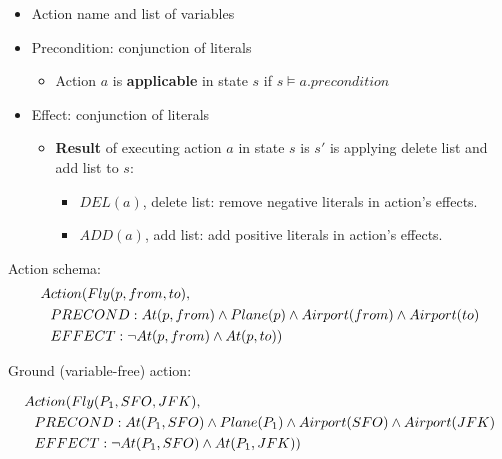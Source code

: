 \documentclass[11pt]{article}
\begin{document}
\begin{itemize}
\item Action name and list of variables
\item Precondition: conjunction of literals

\begin{itemize}
\item Action \(a\) is \textbf{applicable} in state \(s\) if \(s \models a.precondition\)
\end{itemize}

\item Effect: conjunction of literals

\begin{itemize}
\item \textbf{Result} of executing action \(a\) in state \(s\) is \(s'\) is applying delete list and add list to \(s\):

\begin{itemize}
\item \(DEL(a)\), delete list: remove negative literals in action's effects.
\item \(ADD(a)\), add list: add positive literals in action's effects.
\end{itemize}
\end{itemize}
\end{itemize}


Action schema:
\vspace{-.25in}
\begin{align*}
& Action(Fly(p,from,to),\\
& \hspace{.1in} PRECOND:At(p,from) \land Plane(p) \land Airport(from) \land Airport(to)\\
& \hspace{.1in} EFFECT: \neg At(p,from) \land At(p,to))
\end{align*}
\vspace{-.25in}

Ground (variable-free) action:

\vspace{-.25in}
\begin{align*}
& Action(Fly(P_1,SFO,JFK), \\
& \hspace{.1in} PRECOND:At(P_1,SFO) \land Plane(P_1) \land Airport(SFO) \land Airport(JFK) \\
& \hspace{.1in} EFFECT: \neg At(P_1,SFO) \land At(P_1,JFK))
\end{align*}
\vspace{-.25in}
\end{document}
